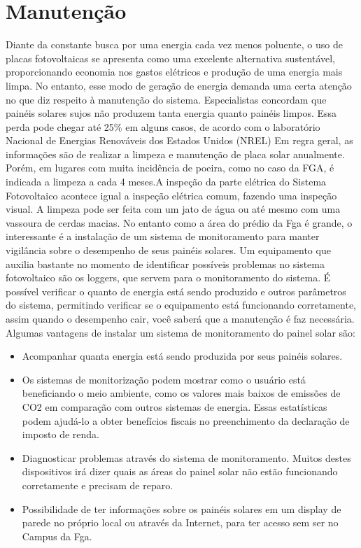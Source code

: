 \section{Manutenção}
Diante da constante busca por uma energia cada vez menos poluente, o uso de placas fotovoltaicas se apresenta como uma excelente alternativa sustentável, proporcionando economia nos gastos elétricos e produção de uma energia mais limpa. No entanto, esse modo de geração de energia demanda uma certa atenção no que diz respeito à manutenção do sistema.
Especialistas concordam que painéis solares sujos não produzem tanta energia quanto painéis limpos. Essa perda pode chegar até 25\% em alguns casos, de acordo com o laboratório Nacional de Energias Renováveis dos Estados Unidos (NREL)
Em regra geral, as informações são de realizar a limpeza e manutenção de placa solar anualmente. Porém, em lugares com muita incidência de poeira, como no caso da FGA, é indicada a limpeza a cada 4 meses.A inspeção da parte elétrica do Sistema Fotovoltaico acontece igual a inspeção elétrica comum, fazendo uma inspeção visual. A limpeza pode ser feita com um jato de água ou até mesmo com uma vassoura de cerdas macias. No entanto como a área do prédio da Fga é grande, o interessante é a instalação de um sistema de monitoramento para manter vigilância sobre o desempenho de seus painéis solares.
Um equipamento que auxilia bastante no momento de identificar possíveis problemas no sistema fotovoltaico são os loggers, que servem para o monitoramento do sistema. É possível verificar o quanto de energia está sendo produzido e outros parâmetros do sistema, permitindo verificar se o equipamento está funcionando corretamente, assim quando o desempenho cair, você saberá que a manutenção é faz necessária.  
Algumas vantagens de instalar um sistema de monitoramento do painel solar são:

\begin{itemize}
  \item Acompanhar quanta energia está sendo produzida por seus painéis solares.
  \item Os sistemas de monitorização podem mostrar como o usuário está beneficiando o meio ambiente, como os valores mais baixos de emissões de CO2 em comparação com outros sistemas de energia. Essas estatísticas podem ajudá-lo a obter benefícios fiscais no preenchimento da declaração de imposto de renda.
  \item Diagnosticar problemas através do sistema de monitoramento. Muitos destes dispositivos irá  dizer quais as áreas do painel solar não estão funcionando corretamente e precisam de reparo.
  \item Possibilidade de ter  informações sobre os  painéis solares em um display de parede no próprio local ou através da Internet, para ter acesso sem ser no Campus da Fga.
\end{itemize}

